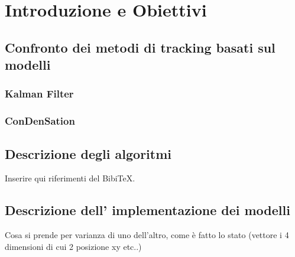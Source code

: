 
\chapter{Introduzione e Obiettivi}

\section{Confronto dei metodi di tracking basati sul modelli}
\subsection{Kalman Filter}
\subsection{ConDenSation}
\section{Descrizione degli algoritmi}
Inserire qui riferimenti del  Bibi\TeX.
\section{Descrizione dell' implementazione dei modelli}
Cosa si prende per varianza di uno dell'altro, come è fatto lo stato (vettore i 4 dimensioni di cui 2 posizione xy etc..)
